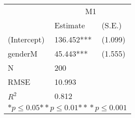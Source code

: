 \begin{tabular}{*{3}{l}}
\hline
                  & \multicolumn{2}{c}{M1}   \tabularnewline
                   &Estimate  &(S.E.)  \tabularnewline
 \hline
 \hline
   (Intercept)     &136.452***   &   (1.099) \tabularnewline
   genderM         &45.443***   &   (1.555) \tabularnewline
 \hline
 N                 &200       &        \tabularnewline
 RMSE             &10.993         & \tabularnewline
 $R^2$             &0.812         & \tabularnewline
 \hline
\hline
 
 \multicolumn{3}{c}{${*  p}\le 0.05$${*\!\!*  p}\le 0.01$${*\!\!*\!\!*  p}\le 0.001$}\tabularnewline
 \end{tabular}
